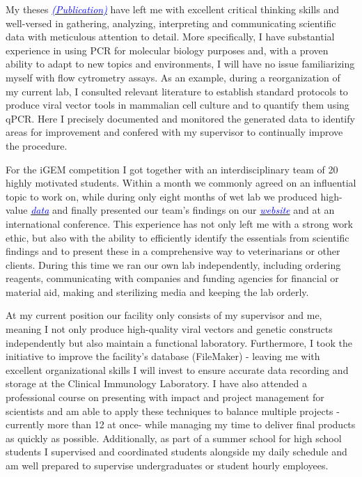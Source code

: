 \documentclass[11pt,a4paper,sans]{moderncv}
\begin{document}
\begin{spacing}{1.1}
My theses {\href{https://www.ncbi.nlm.nih.gov/pubmed/29517395}{\textcolor{blue}{{\textit{(Publication)}}}}} have left me with excellent critical thinking skills and well-versed in gathering, analyzing, interpreting and communicating scientific data with meticulous attention to detail. More specifically, I have substantial experience in using PCR for molecular biology purposes and, with a proven ability to adapt to new topics and environments, I will have no issue familiarizing myself with flow cytrometry assays. As an example, during a reorganization of my current lab, I consulted relevant literature to establish standard protocols to produce viral vector tools in mammalian cell culture and to quantify them using qPCR. Here I precisely documented and monitored the generated data to identify areas for improvement and confered with my supervisor to continually improve the procedure. \par%
For the iGEM competition I got together with an interdisciplinary team of 20 highly motivated students. Within a month we commonly agreed on an influential topic to work on, while during only eight months of wet lab we produced high-value  {\href{https://www.ncbi.nlm.nih.gov/pubmed/29803867}{\textcolor{blue}{\textit{data}}}} and finally presented our team's findings on our {\href{http://2015.igem.org/Team:Freiburg}{\textcolor{blue}{\textit{website}}}} and at an international conference. This experience has not only left me with a strong work ethic, but also with the ability to efficiently identify the essentials from scientific findings and to present these in a comprehensive way to veterinarians or other clients. During this time we ran our own lab independently, including ordering reagents, communicating with companies and funding agencies for financial or material aid, making and sterilizing media and keeping the lab orderly. \par 
At my current position our facility only consists of my supervisor and me, meaning I not only produce high-quality viral vectors and genetic constructs independently but also maintain a functional laboratory. Furthermore, I took the initiative to improve the facility's database (FileMaker) - leaving me with excellent organizational skills I will invest to ensure accurate data recording and storage at the Clinical Immunology Laboratory. I have also attended a professional course on presenting with impact and project management for scientists and am able to apply these techniques to balance multiple projects - currently more than 12 at once- while managing my time to deliver final products as quickly as possible. Additionally, as part of a summer school for high school students I supervised and coordinated students alongside my daily schedule and am well prepared to supervise undergraduates or student hourly employees. \par%



\end{spacing}
\end{document}

